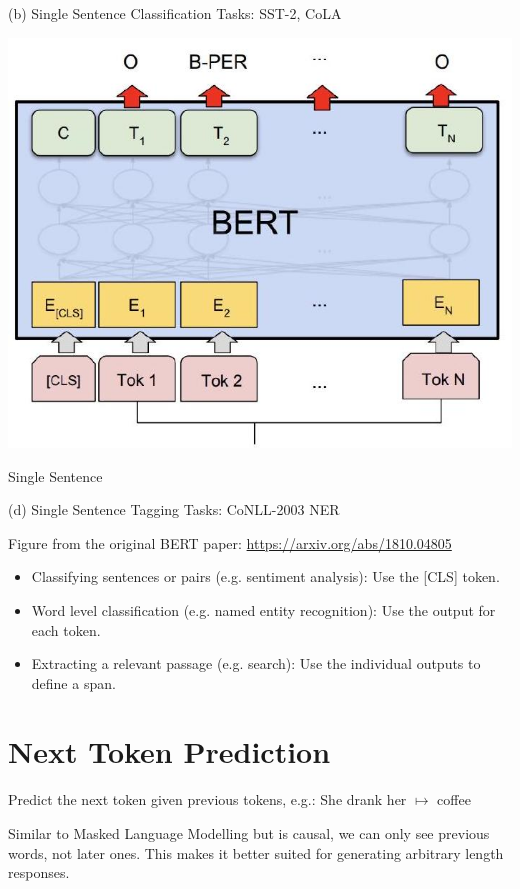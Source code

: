 \documentclass[10pt]{article}
\begin{document}
(b) Single Sentence Classification Tasks: SST-2, CoLA

\begin{center}
\includegraphics[max width=\textwidth]{2024_01_08_7c14f4867d7823fc5a52g-06(2)}
\end{center}

Single Sentence

(d) Single Sentence Tagging Tasks: CoNLL-2003 NER

Figure from the original BERT paper: \href{https://arxiv.org/abs/1810.04805}{https://arxiv.org/abs/1810.04805}

\begin{itemize}
  \item Classifying sentences or pairs (e.g. sentiment analysis): Use the [CLS] token.
  \item Word level classification (e.g. named entity recognition): Use the output for each token.
  \item Extracting a relevant passage (e.g. search): Use the individual outputs to define a span.
\end{itemize}

\section*{Next Token Prediction}
Predict the next token given previous tokens, e.g.: She drank her $\mapsto$ coffee

Similar to Masked Language Modelling but is causal, we can only see previous words, not later ones. This makes it better suited for generating arbitrary length responses.
\end{document}
